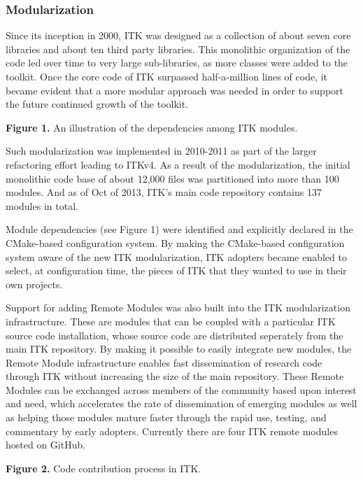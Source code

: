 \documentclass{frontiersENG} %
\begin{document}
\subsubsection{Modularization}

Since its inception in 2000, ITK was designed as a collection of about seven
core libraries and about ten third party libraries.  This monolithic
organization of the code led over time to very large sub-libraries, as more
classes were added to the toolkit. Once the core code of ITK surpassed
half-a-million lines of code, it became evident that a more modular approach
was needed in order to support the future continued growth of the toolkit.

\textbf{Figure 1. }{An illustration of the dependencies among ITK modules.}\label{fig:01}

Such modularization was implemented in 2010-2011 as part of the larger
refactoring effort leading to ITKv4.  As a result of the modularization, the
initial monolithic code base of about 12,000 files was partitioned into more
than 100 modules.  And as of Oct of 2013, ITK's main code repository contains
137 modules in total.

Module dependencies (see Figure 1) were identified and explicitly declared in
the CMake-based \cite{CMake} configuration system. By making the CMake-based
configuration system aware of the new ITK modularization, ITK adopters became
enabled to select, at configuration time, the pieces of ITK that they wanted to
use in their own projects.

Support for adding Remote Modules was also built into the ITK modularization
infrastructure. These are modules that can be coupled with a particular
ITK source code installation, whose source code are distributed seperately from
the main ITK repository. By making it possible to easily integrate
new modules, the Remote Module infrastructure enables fast
dissemination of research code through ITK without increasing the size of the
main repository. These Remote Modules can be exchanged across members of the
community based upon interest and need, which accelerates the rate
of dissemination of emerging modules as well as helping those modules mature
faster through the rapid use, testing, and commentary by early adopters. Currently
there are four ITK remote modules hosted on GitHub.

\textbf{Figure 2. }{Code contribution process in ITK.}\label{fig:02}
\end{document}
